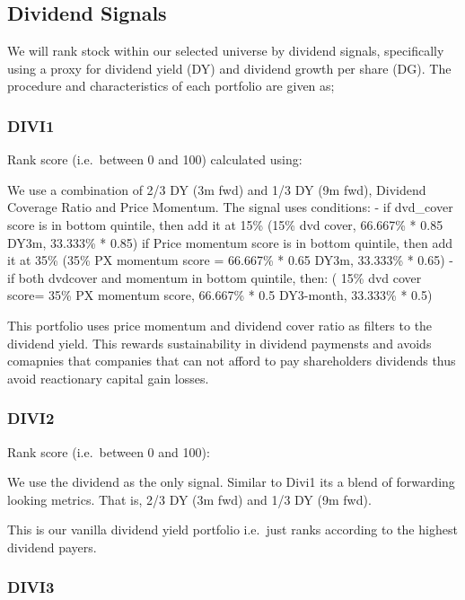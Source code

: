 \documentclass[12pt,preprint, authoryear]{elsarticle}
\numberwithin{equation}{section}
\numberwithin{figure}{section}
\numberwithin{table}{section}
\begin{document}
\newpage

\hypertarget{dividend-signals}{%
\subsection{Dividend Signals}\label{dividend-signals}}

We will rank stock within our selected universe by dividend signals,
specifically using a proxy for dividend yield (DY) and dividend growth
per share (DG). The procedure and characteristics of each portfolio are
given as;

\hypertarget{divi1}{%
\subsubsection{DIVI1}\label{divi1}}

Rank score (i.e.~between 0 and 100) calculated using:

We use a combination of 2/3 DY (3m fwd) and 1/3 DY (9m fwd), Dividend
Coverage Ratio and Price Momentum. The signal uses conditions: - if
dvd\_cover score is in bottom quintile, then add it at 15\% (15\% dvd
cover, 66.667\% * 0.85 DY3m, 33.333\% * 0.85) if Price momentum score is
in bottom quintile, then add it at 35\% (35\% PX momentum score =
66.667\% * 0.65 DY3m, 33.333\% * 0.65) - if both dvdcover and momentum
in bottom quintile, then: ( 15\% dvd cover score= 35\% PX momentum
score, 66.667\% * 0.5 DY3-month, 33.333\% * 0.5)

This portfolio uses price momentum and dividend cover ratio as filters
to the dividend yield. This rewards sustainability in dividend paymensts
and avoids comapnies that companies that can not afford to pay
shareholders dividends thus avoid reactionary capital gain losses.

\hypertarget{divi2}{%
\subsubsection{DIVI2}\label{divi2}}

Rank score (i.e.~between 0 and 100):

We use the dividend as the only signal. Similar to Divi1 its a blend of
forwarding looking metrics. That is, 2/3 DY (3m fwd) and 1/3 DY (9m
fwd).

This is our vanilla dividend yield portfolio i.e.~just ranks according
to the highest dividend payers.

\hypertarget{divi3}{%
\subsubsection{DIVI3}\label{divi3}}
\end{document}

